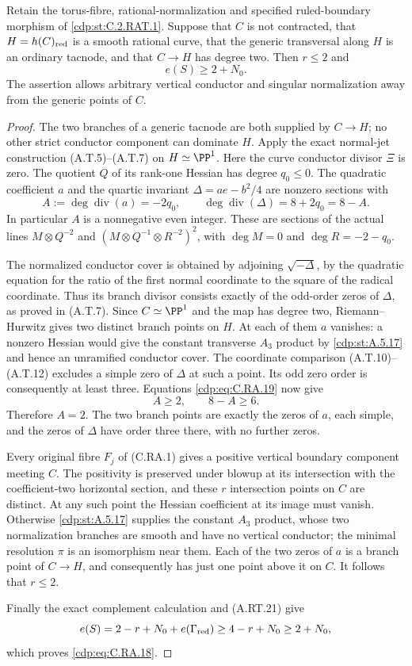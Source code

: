 
\begin{proposition}\label{cdp:st:C.2.RAT.2}
Retain the torus-fibre, rational-normalization and specified
ruled-boundary morphism of \ref{cdp:st:C.2.RAT.1}. Suppose that $C$ is not
contracted, that $H=h(C)_{\rm red}$ is a smooth rational curve,
that the generic transversal along $H$ is an ordinary tacnode,
and that $C\to H$ has degree two. Then $r\le2$ and
\[
                         e(S)\ge2+N_0.
\tag{C.RA.18}\label{cdp:eq:C.RA.18}
\]
The assertion allows arbitrary vertical conductor and singular
normalization away from the generic points of $C$.
\end{proposition}
\begin{proof}
The two branches of a generic tacnode are both supplied by
$C\to H$; no other strict conductor component can dominate $H$.
Apply the exact normal-jet construction (A.T.5)--(A.T.7) on
$H\simeq\PP^1$. Here the curve conductor divisor $\Xi$ is zero.
The quotient $Q$ of its rank-one Hessian has degree $q_0\le0$.
The quadratic coefficient $a$ and the quartic invariant
$\Delta=ae-b^2/4$ are nonzero sections with
\[
 A:=\deg\operatorname{div}(a)=-2q_0,\qquad
 \deg\operatorname{div}(\Delta)=8+2q_0=8-A.
\tag{C.RA.19}\label{cdp:eq:C.RA.19}
\]
In particular $A$ is a nonnegative even integer. These are
sections of the actual lines $M\otimes Q^{-2}$ and
$(M\otimes Q^{-1}\otimes R^{-2})^2$, with
$\deg M=0$ and $\deg R=-2-q_0$.

The normalized conductor cover is obtained by adjoining
$\sqrt{-\Delta}$, by the quadratic equation for the ratio of
the first normal coordinate to the square of the radical
coordinate. Thus its branch divisor consists exactly of the
odd-order zeros of $\Delta$, as proved in (A.T.7). Since
$C\simeq\PP^1$ and the map has degree two, Riemann--Hurwitz
gives two distinct branch points on $H$. At each of them
$a$ vanishes: a nonzero Hessian would give the constant
transverse $A_3$ product by \ref{cdp:st:A.5.17} and hence an unramified
conductor cover. The coordinate comparison
(A.T.10)--(A.T.12) excludes a simple zero of $\Delta$ at
such a point. Its odd zero order is consequently at least
three. Equations \eqref{cdp:eq:C.RA.19} now give
\[
                        A\ge2,\qquad 8-A\ge6.
\tag{C.RA.20}\label{cdp:eq:C.RA.20}
\]
Therefore $A=2$. The two branch points are exactly the
zeros of $a$, each simple, and the zeros of $\Delta$ have
order three there, with no further zeros.

Every original fibre $F_j$ of (C.RA.1) gives a positive
vertical boundary component meeting $C$. The positivity
is preserved under blowup at its intersection with the
coefficient-two horizontal section, and these $r$
intersection points on $C$ are distinct. At any such point
the Hessian coefficient at its image must vanish. Otherwise
\ref{cdp:st:A.5.17} supplies the constant $A_3$ product, whose two
normalization branches are smooth and have no vertical
conductor; the minimal resolution $\pi$ is an isomorphism
near them. Each of the two zeros of $a$ is a branch point
of $C\to H$, and consequently has just one point above it
on $C$. It follows that $r\le2$.

Finally the exact complement calculation and (A.RT.21) give
\[
 e(S)=2-r+N_0+e(\Gamma_{\rm red})
                  \ge4-r+N_0\ge2+N_0,
\]
which proves \eqref{cdp:eq:C.RA.18}.
\end{proof}


